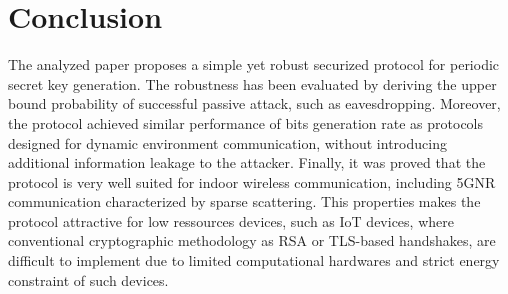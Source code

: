 \chapter{Conclusion}

The analyzed paper proposes a simple yet robust securized protocol for periodic secret key generation.  The robustness has been evaluated by deriving the upper bound probability of successful passive attack, such as eavesdropping.  Moreover, the protocol achieved similar performance of bits generation rate as protocols designed for dynamic environment communication, without introducing additional information leakage to the attacker.  Finally, it was proved that the protocol is very well suited for indoor wireless communication, including 5GNR communication characterized by sparse scattering.  This properties makes the protocol attractive for low ressources devices, such as IoT devices, where conventional cryptographic methodology as RSA or TLS-based handshakes, are difficult to implement due to limited computational hardwares and strict energy constraint of such devices.